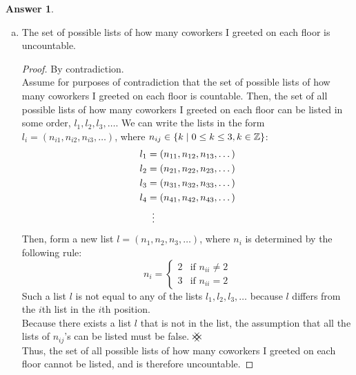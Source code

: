 \documentclass[article, 12pt]{article}
\theoremstyle{definition}
\newtheorem{answer}{Answer}
\DeclarePairedDelimiter\set{\{}{\}}
\newcommand{\ints}{\mathbb{Z}}
\newcommand{\contradiction}{{\hbox{%
    \setbox0=\hbox{$\mkern-3mu\times\mkern-3mu$}%
    \setbox1=\hbox to0pt{\hss$\times$\hss}%
    \copy0\raisebox{0.5\wd0}{\copy1}\raisebox{-0.5\wd0}{\box1}\box0
}}}
\begin{document}
\begin{answer}
\begin{enumerate}[a)]
            \item The set of possible lists of how many coworkers I greeted on each floor is uncountable. 
            \begin{proof} By contradiction.
                \\[12pt]
                Assume for purposes of contradiction that the set of possible lists of how many coworkers I greeted on each floor is countable. Then, the set of all possible lists of how many coworkers I greeted on each floor can be listed in some order, $l_1, l_2, l_3, \dots$. We can write the lists in the form $l_i = (n_{i1}, n_{i2}, n_{i3}, \dots)$, where $n_{ij} \in \set*{k \mid 0 \leq k \leq 3, k \in \ints}$:
                    \begin{align*}
                        l_1 &= (n_{11}, n_{12}, n_{13}, \dots) \\
                        l_2 &= (n_{21}, n_{22}, n_{23}, \dots) \\
                        l_3 &= (n_{31}, n_{32}, n_{33}, \dots) \\
                        l_4 &= (n_{41}, n_{42}, n_{43}, \dots) \\
                            &\vdotswithin{=}
                    \end{align*}
                Then, form a new list $l = (n_1, n_2, n_3, \dots)$, where $n_i$ is determined by the following rule:
                \begin{equation*}
                    n_i = \begin{cases}
                        2 & \text{if } n_{ii} \neq 2 \\
                        3 & \text{if } n_{ii} = 2
                    \end{cases}
                \end{equation*}
                Such a list $l$ is not equal to any of the lists $l_1, l_2, l_3, \dots$ because $l$ differs from the $i$th list in the $i$th position.
                \\[12pt]
                Because there exists a list $l$ that is not in the list, the assumption that all the lists of $n_{ij}$'s can be listed must be false. $\contradiction$
                \\[12pt]
                Thus, the set of all possible lists of how many coworkers I greeted on each floor cannot be listed, and is therefore uncountable.
            \end{proof}
        \end{enumerate}
    \end{answer}
\end{document}
